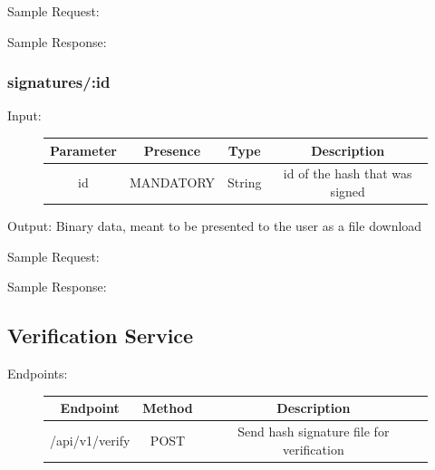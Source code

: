 Sample Request:


Sample Response:



\subsubsection{signatures/:id}
Input:

\begin{figure}[H]
    \begin{center}
        \begin{tabular}{c|c|c|c}
            \textbf{Parameter} & \textbf{Presence} & \textbf{Type} & \textbf{Description} \\
            \hline
            id & MANDATORY & String & id of the hash that was signed \\
        \end{tabular}
    \end{center}
\end{figure}

Output: Binary data, meant to be presented to the user as a file download


Sample Request:



Sample Response:



\subsection{Verification Service}\label{subsec:verification-service}
Endpoints:

\begin{figure}[H]
    \begin{center}
        \begin{tabular}{c|c|c}
            \textbf{Endpoint} & \textbf{Method} & \textbf{Description} \\
            \hline
            /api/v1/verify & POST & Send hash signature file for verification \\
        \end{tabular}
    \end{center}
\end{figure}

